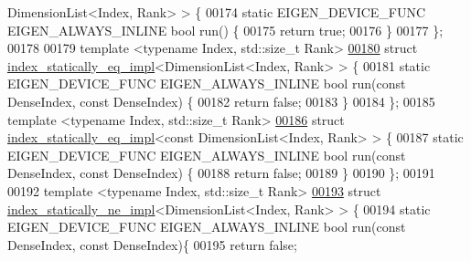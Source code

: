 \begin{DoxyCode}
      DimensionList<Index, Rank> > \{
00174   \textcolor{keyword}{static} EIGEN\_DEVICE\_FUNC EIGEN\_ALWAYS\_INLINE \textcolor{keywordtype}{bool} run() \{
00175     \textcolor{keywordflow}{return} \textcolor{keyword}{true};
00176   \}
00177 \};
00178 
00179 \textcolor{keyword}{template} <\textcolor{keyword}{typename} Index, std::\textcolor{keywordtype}{size\_t} Rank>
\hyperlink{struct_eigen_1_1internal_1_1index__statically__eq__impl_3_01_dimension_list_3_01_index_00_01_rank_01_4_01_4}{00180} \textcolor{keyword}{struct }\hyperlink{struct_eigen_1_1internal_1_1index__statically__eq__impl}{index\_statically\_eq\_impl}<DimensionList<Index, Rank> > \{
00181   \textcolor{keyword}{static} EIGEN\_DEVICE\_FUNC EIGEN\_ALWAYS\_INLINE \textcolor{keywordtype}{bool} run(\textcolor{keyword}{const} DenseIndex, \textcolor{keyword}{const} DenseIndex) \{
00182     \textcolor{keywordflow}{return} \textcolor{keyword}{false};
00183   \}
00184 \};
00185 \textcolor{keyword}{template} <\textcolor{keyword}{typename} Index, std::\textcolor{keywordtype}{size\_t} Rank>
\hyperlink{struct_eigen_1_1internal_1_1index__statically__eq__impl_3_01const_01_dimension_list_3_01_index_00_01_rank_01_4_01_4}{00186} \textcolor{keyword}{struct }\hyperlink{struct_eigen_1_1internal_1_1index__statically__eq__impl}{index\_statically\_eq\_impl}<const DimensionList<Index, Rank> > \{
00187   \textcolor{keyword}{static} EIGEN\_DEVICE\_FUNC EIGEN\_ALWAYS\_INLINE \textcolor{keywordtype}{bool} run(\textcolor{keyword}{const} DenseIndex, \textcolor{keyword}{const} DenseIndex) \{
00188     \textcolor{keywordflow}{return} \textcolor{keyword}{false};
00189   \}
00190 \};
00191 
00192 \textcolor{keyword}{template} <\textcolor{keyword}{typename} Index, std::\textcolor{keywordtype}{size\_t} Rank>
\hyperlink{struct_eigen_1_1internal_1_1index__statically__ne__impl_3_01_dimension_list_3_01_index_00_01_rank_01_4_01_4}{00193} \textcolor{keyword}{struct }\hyperlink{struct_eigen_1_1internal_1_1index__statically__ne__impl}{index\_statically\_ne\_impl}<DimensionList<Index, Rank> > \{
00194   \textcolor{keyword}{static} EIGEN\_DEVICE\_FUNC EIGEN\_ALWAYS\_INLINE \textcolor{keywordtype}{bool} run(\textcolor{keyword}{const} DenseIndex, \textcolor{keyword}{const} DenseIndex)\{
00195     \textcolor{keywordflow}{return} \textcolor{keyword}{false};

\end{DoxyCode}
